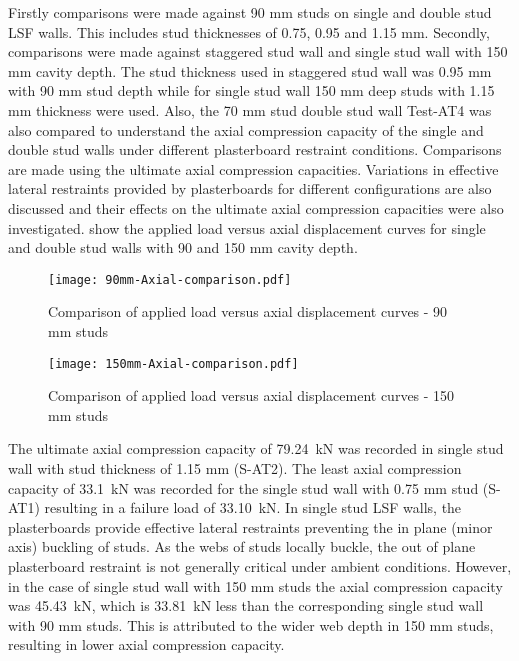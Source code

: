 Firstly comparisons were made against 90 mm studs on single and double stud LSF walls. This includes stud thicknesses of 0.75, 0.95 and 1.15 mm. Secondly, comparisons were made against staggered stud wall and single stud wall with 150 mm cavity depth. The stud thickness used in staggered stud wall was 0.95 mm with 90 mm stud depth while for single stud wall 150 mm deep studs with 1.15 mm thickness were used. Also, the 70 mm stud double stud wall Test-AT4 was also compared to understand the axial compression capacity of the single and double stud walls under different plasterboard restraint conditions. Comparisons are made using the ultimate axial compression capacities. Variations in effective lateral restraints provided by plasterboards for different configurations are also discussed and their effects on the ultimate axial compression capacities were also investigated.  show the applied load versus axial displacement curves for single and double stud walls with 90 and 150 mm cavity depth.
\begin{figure}[!htbp]
	\centering
			\texttt{[image: 90mm-Axial-comparison.pdf]}\\
		\caption{Comparison of applied load versus axial displacement curves - 90 mm studs}
		\label{fig:90mm-comparison-ambient}
\end{figure}
\begin{figure}[!htbp]
	\centering
			\texttt{[image: 150mm-Axial-comparison.pdf]}\\
		\caption{Comparison of applied load versus axial displacement curves - 150 mm studs}
		\label{fig:150mm-comparison-ambient}
\end{figure}

The ultimate axial compression capacity of 79.24~kN was recorded in single stud wall with stud thickness of 1.15 mm (S-AT2). The least axial compression capacity of 33.1~kN was recorded for the single stud wall with 0.75 mm stud (S-AT1) resulting in a failure load of 33.10~kN. In single stud LSF walls, the plasterboards provide effective lateral restraints preventing the in plane (minor axis) buckling of studs. As the webs of studs locally buckle, the out of plane plasterboard restraint is not generally critical under ambient conditions. However, in the case of single stud wall with 150 mm studs the axial compression capacity was 45.43~kN, which is 33.81~kN less than the corresponding single stud wall with 90 mm studs. This is attributed to the wider web depth in 150 mm studs, resulting in lower axial compression capacity.

